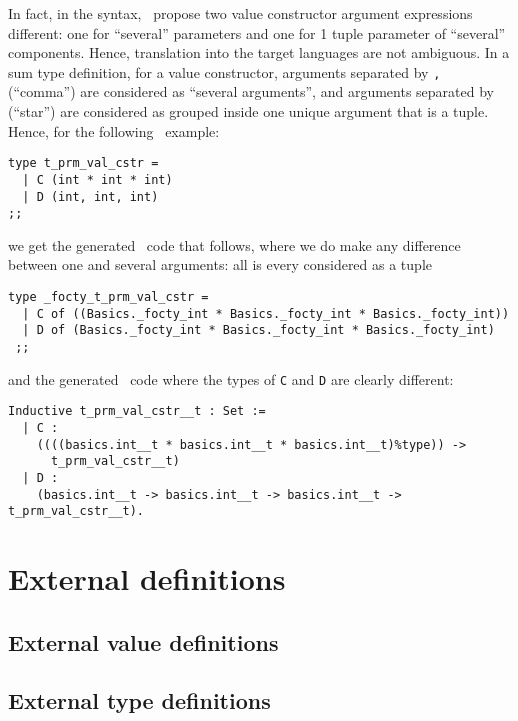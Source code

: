 In fact, in the syntax, \focalize\ propose two value constructor
argument expressions different: one for ``several'' parameters and one
for 1 tuple parameter of ``several'' components. Hence, translation
into the target languages are not ambiguous. In a sum type definition,
for a value constructor, arguments separated by {\tt ,} (``comma'')
are considered as ``several arguments'', and arguments separated by
{\tt *} (``star'') are considered as grouped inside one unique
argument that is a tuple. Hence, for the following \focalize\ example:
{\footnotesize
\begin{lstlisting}[title=Value constructor parameterised by
  ``several'' arguments (2)]
type t_prm_val_cstr =
  | C (int * int * int)
  | D (int, int, int)
;;
\end{lstlisting}
}
we get the generated \ocaml\ code that follows, where we do make any
difference between one and several arguments: all is every considered
as a tuple
{\footnotesize
\begin{lstlisting}[language=MyOCaml,
                   title=Value constructor parameterised by
                   ``several'' arguments in \ocaml\ (2)]
type _focty_t_prm_val_cstr = 
  | C of ((Basics._focty_int * Basics._focty_int * Basics._focty_int))
  | D of (Basics._focty_int * Basics._focty_int * Basics._focty_int)
 ;;
\end{lstlisting}
}
and the generated \coq\ code where the types of {\tt C} and {\tt D}
are clearly different:
{\footnotesize
\begin{lstlisting}[language=MyCoq,
                   title=Value constructor parameterised by
                   ``several'' arguments in \coq\ (2)]
Inductive t_prm_val_cstr__t : Set := 
  | C :
    ((((basics.int__t * basics.int__t * basics.int__t)%type)) ->
      t_prm_val_cstr__t)
  | D :
    (basics.int__t -> basics.int__t -> basics.int__t -> t_prm_val_cstr__t).
\end{lstlisting}
}



\section{External definitions}

\subsection{External value definitions}

\subsection{External type definitions}
\label{external-type-definition}

